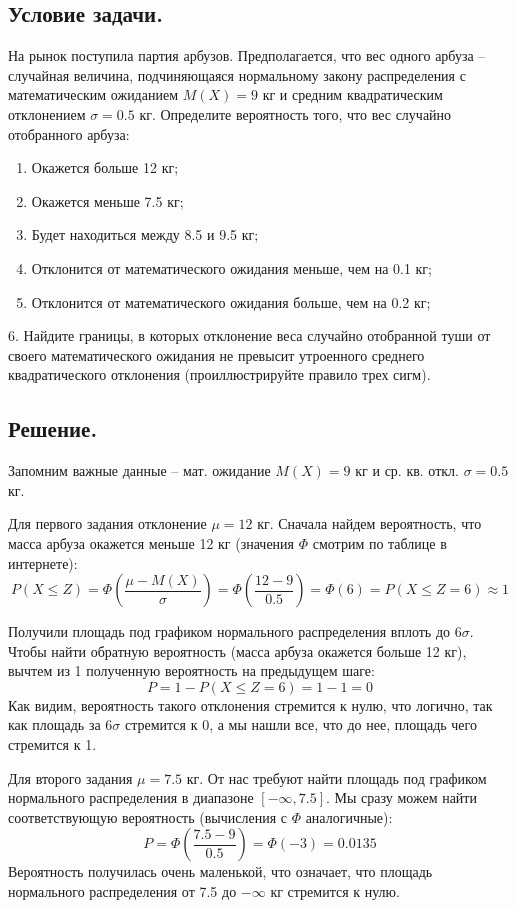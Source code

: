 \documentclass[a4paper, 12pt]{article}
\begin{document}
    \subsection{Условие задачи.}
    На рынок поступила партия арбузов. Предполагается, что вес одного 
    арбуза -- случайная величина, подчиняющаяся нормальному закону 
    распределения с математическим ожиданием $M(X) = 9$ кг и средним 
    квадратическим отклонением $\sigma = 0.5$ кг. Определите вероятность того, 
    что вес случайно отобранного арбуза:
    \begin{enumerate}
        \item Окажется больше 12 кг;
        \item Окажется меньше 7.5 кг;
        \item Будет находиться между 8.5 и 9.5 кг;
        \item Отклонится от математического ожидания меньше, чем на 0.1 кг;
        \item Отклонится от математического ожидания больше, чем на 0.2 кг;
    \end{enumerate}
    6. Найдите границы, в которых отклонение веса случайно отобранной 
    туши от своего математического ожидания не превысит утроенного среднего 
    квадратического отклонения (проиллюстрируйте правило трех сигм).


    \subsection{Решение.}
    Запомним важные данные -- мат. ожидание $M(X)=9$ кг и ср. кв. откл. $\sigma=0.5$ кг.


    Для первого задания отклонение $\mu=12$ кг. Сначала найдем вероятность, что масса арбуза
    окажется меньше 12 кг (значения $\Phi$ смотрим по таблице в интернете):
    $$
    P(X\leq Z)=\Phi\left(\dfrac{\mu-M(X)}{\sigma}\right)=\Phi\left(\dfrac{12-9}{0.5}\right)=\Phi\left(6\right)=P(X\leq Z=6)\approx 1
    $$


    Получили площадь под графиком нормального распределения вплоть до $6\sigma$.
    Чтобы найти обратную вероятность (масса арбуза окажется больше 12 кг), вычтем из 1 полученную вероятность
    на предыдущем шаге:
    $$
    P=1-P(X\leq Z=6)=1-1=0
    $$
    Как видим, вероятность такого отклонения стремится к нулю, что логично, так как площадь за $6\sigma$ стремится к 0,
    а мы нашли все, что до нее, площадь чего стремится к 1.


    Для второго задания $\mu=7.5$ кг. От нас требуют найти площадь под графиком нормального распределения в
    диапазоне $[-\infty,7.5]$. Мы сразу можем найти соответствующую вероятность (вычисления с $\Phi$ аналогичные):
    $$
    P=\Phi\left(\dfrac{7.5-9}{0.5}\right)=\Phi(-3)=0.0135
    $$
    Вероятность получилась очень маленькой, что означает, что площадь нормального распределения от 7.5 до $-\infty$ кг
    стремится к нулю.
\end{document}
